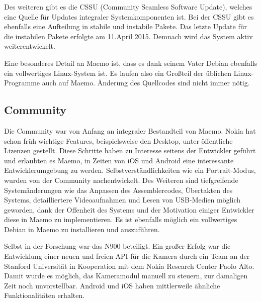 Des weiteren gibt es die CSSU\thinspace\cite{online:maemo-cssu} (Community Seamless Software Update), welches eine Quelle für Updates integraler Systemkomponenten ist. Bei der CSSU gibt es ebenfalls eine Aufteilung in stabile und instabile Pakete. Das letzte Update für die instabilen Pakete erfolgte am 11.\@ April 2015\thinspace\cite{online:maemo-cssuchangelog}. Demnach wird das System aktiv weiterentwickelt.

Eine besonderes Detail an Maemo ist, dass es dank seinem Vater Debian ebenfalls ein vollwertiges Linux-System ist. Es laufen also ein Großteil der üblichen Linux-Programme auch auf Maemo. Änderung des Quellcodes sind nicht immer nötig.
\newline

\subsection{Community}
Die Community war von Anfang an integraler Bestandteil von Maemo. Nokia hat schon früh wichtige Features, beispielsweise den Desktop, unter öffentliche Lizenzen gestellt\thinspace\cite{online:maemo-hildon}. Diese Schritte haben zu Interesse seitens der Entwickler geführt und erlaubten es Maemo, in Zeiten von iOS und Android eine interessante Entwicklerumgebung zu werden. Selbstverständlichkeiten wie ein Portrait-Modus, wurden von der Community nachentwickelt\thinspace\cite{online:maemo-portrait}. Des Weiteren sind tiefgreifende Systemänderungen wie das Anpassen des Assemblercodes\thinspace\cite{online:maemo-thumb}, Übertakten des Systems\thinspace\cite{online:maemo-overclocking}, detailliertere Videoaufnahmen\thinspace\cite{online:maemo-hdvideo} und Lesen von \mbox{USB-Medien}\thinspace\cite{online:maemo-usbhost}  möglich geworden, dank der Offenheit des Systems und der Motivation einiger Entwickler diese in Maemo zu implementieren. Es ist ebenfalls möglich ein vollwertiges Debian in Maemo zu installieren und auszuführen\thinspace\cite{online:maemo-easydebian}\thinspace\cite{online:maemo-easydebianwiki}.

Selbst in der Forschung war das N900 beteiligt. Ein großer Erfolg war die Entwicklung einer neuen und freien API für die Kamera durch ein Team an der Stanford Universität in Kooperation mit dem Nokia Research Center Paolo Alto\thinspace\cite{online:maemo-fcam}. Damit wurde es möglich, das Kameramodul manuell zu steuern, zur damaligen Zeit noch unvorstellbar. Android und iOS haben mittlerweile ähnliche Funktionalitäten erhalten\thinspace\cite{online:maemo-fcamlegacy}.

